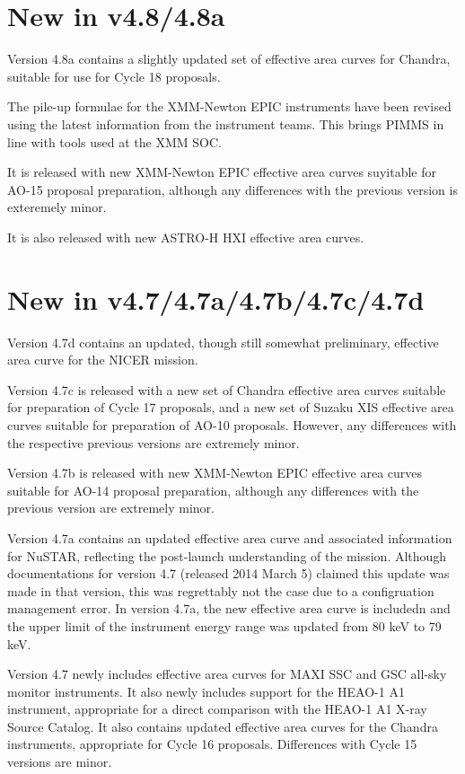 \section{New in v4.8/4.8a}

Version 4.8a contains a slightly updated set of effective area curves
for Chandra, suitable for use for Cycle 18 proposals.

The pile-up formulae for the XMM-Newton EPIC instruments have been revised
using the latest information from the instrument teams. This brings PIMMS
in line with tools used at the XMM SOC.

It is released with new XMM-Newton EPIC effective area curves suyitable
for AO-15 proposal preparation, although any differences with the previous
version is exteremely minor.

It is also released with new ASTRO-H HXI effective area curves.

\section{New in v4.7/4.7a/4.7b/4.7c/4.7d}

Version 4.7d contains an updated, though still somewhat preliminary,
effective area curve for the NICER mission.

Version 4.7c is released with a new set of Chandra effective area curves
suitable for preparation of Cycle 17 proposals, and a new set of Suzaku
XIS effective area curves suitable for preparation of AO-10 proposals.
However, any differences with the respective previous versions are
extremely minor.

Version 4.7b is released with new XMM-Newton EPIC effective area curves
suitable for AO-14 proposal preparation, although any differences with
the previous version are extremely minor.

Version 4.7a contains an updated effective area curve and associated
information for NuSTAR, reflecting the post-launch understanding of the
mission.  Although documentations for version 4.7 (released 2014 March 5)
claimed this update was made in that version, this was regrettably not
the case due to a configruation management error. In version 4.7a, the
new effective area curve is includedn and the upper limit of the instrument
energy range was updated from 80 keV to 79 keV.

Version 4.7 newly includes effective area curves for MAXI SSC and GSC
all-sky monitor instruments. It also newly includes support for the HEAO-1
A1 instrument, appropriate for a direct comparison with the HEAO-1 A1 X-ray
Source Catalog. It also contains updated effective area curves for the Chandra
instruments, appropriate for Cycle 16 proposals.  Differences with Cycle 15
versions are minor.

